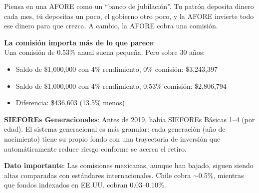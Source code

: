 \documentclass[11pt,a4paper]{report}
\begin{document}
\begin{tcolorbox}[colback=green!5!white, colframe=green!50!black, title=\textbf{Intuici\'on}]
Piensa en una AFORE como un ``banco de jubilaci\'on''. Tu patr\'on deposita dinero cada mes, t\'u depositas un poco, el gobierno otro poco, y la AFORE invierte todo ese dinero para que crezca. A cambio, la AFORE cobra una comisi\'on.

\textbf{La comisi\'on importa m\'as de lo que parece}:\\
Una comisi\'on de 0.53\% anual suena peque\~na. Pero sobre 30 a\~nos:
\begin{itemize}[nosep]
\item Saldo de \$1,000,000 con 4\% rendimiento, 0\% comisi\'on: \$3,243,397
\item Saldo de \$1,000,000 con 4\% rendimiento, 0.53\% comisi\'on: \$2,806,794
\item Diferencia: \$436,603 (13.5\% menos)
\end{itemize}

\textbf{SIEFOREs Generacionales}: Antes de 2019, hab\'ia SIEFOREs B\'asicas 1--4 (por edad). El sistema generacional es m\'as granular: cada generaci\'on (a\~no de nacimiento) tiene su propio fondo con una trayectoria de inversi\'on que autom\'aticamente reduce riesgo conforme se acerca el retiro.

\textbf{Dato importante}: Las comisiones mexicanas, aunque han bajado, siguen siendo altas comparadas con est\'andares internacionales. Chile cobra $\sim$0.5\%, mientras que fondos indexados en EE.UU. cobran 0.03--0.10\%.
\end{tcolorbox}
\end{document}

